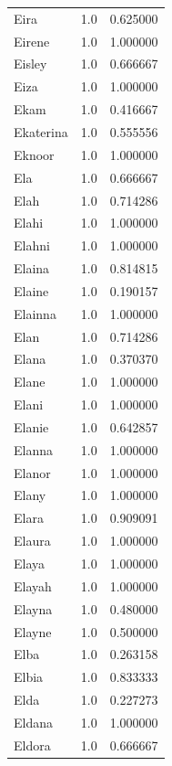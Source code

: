 \documentclass[
  letterpaper,
  DIV=11,
  numbers=noendperiod]{scrreprt}
\begin{document}
\begin{tabular}{lrr}
Eira            &   1.0 &   0.625000 \\
Eirene          &   1.0 &   1.000000 \\
Eisley          &   1.0 &   0.666667 \\
Eiza            &   1.0 &   1.000000 \\
Ekam            &   1.0 &   0.416667 \\
Ekaterina       &   1.0 &   0.555556 \\
Eknoor          &   1.0 &   1.000000 \\
Ela             &   1.0 &   0.666667 \\
Elah            &   1.0 &   0.714286 \\
Elahi           &   1.0 &   1.000000 \\
Elahni          &   1.0 &   1.000000 \\
Elaina          &   1.0 &   0.814815 \\
Elaine          &   1.0 &   0.190157 \\
Elainna         &   1.0 &   1.000000 \\
Elan            &   1.0 &   0.714286 \\
Elana           &   1.0 &   0.370370 \\
Elane           &   1.0 &   1.000000 \\
Elani           &   1.0 &   1.000000 \\
Elanie          &   1.0 &   0.642857 \\
Elanna          &   1.0 &   1.000000 \\
Elanor          &   1.0 &   1.000000 \\
Elany           &   1.0 &   1.000000 \\
Elara           &   1.0 &   0.909091 \\
Elaura          &   1.0 &   1.000000 \\
Elaya           &   1.0 &   1.000000 \\
Elayah          &   1.0 &   1.000000 \\
Elayna          &   1.0 &   0.480000 \\
Elayne          &   1.0 &   0.500000 \\
Elba            &   1.0 &   0.263158 \\
Elbia           &   1.0 &   0.833333 \\
Elda            &   1.0 &   0.227273 \\
Eldana          &   1.0 &   1.000000 \\
Eldora          &   1.0 &   0.666667 \\

\end{tabular}
\end{document}
